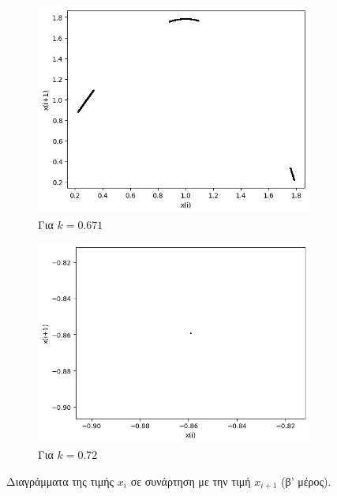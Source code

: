 \begin{figure}
\begin{subfigure}[b]{0.4\textwidth}
		\includegraphics[width=\textwidth]{LateX images/graphs q09/g11}
		\caption{Για $k=0.671$}
		\label{f:k57}
	\end{subfigure}
	\hfill
	\begin{subfigure}[b]{0.4\textwidth}
		\centering
		\includegraphics[width=\textwidth]{LateX images/graphs q09/g12}
		\caption{Για $k=0.72$}
		\label{f:k58}
	\end{subfigure}
	\hfill
	\caption{Διαγράμματα της τιμής \(x_i\) σε συνάρτηση με την τιμή \(x_{i+1}\) (β' μέρος).}
\end{figure}

\clearpage

